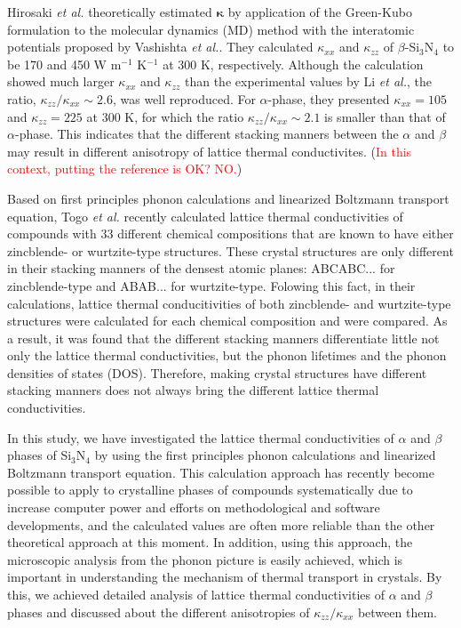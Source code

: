 \documentclass[twocolumn,amsmath,amssymb,a4paper,prb,superscriptaddress,floatfix]{revtex4-1}
\begin{document}
Hirosaki {\it et al.}\cite{hirosaki-md} theoretically estimated
$\boldsymbol{\kappa}$ by application of the Green-Kubo formulation to
the molecular dynamics (MD) method with the interatomic potentials
proposed by Vashishta {\it et al.}\cite{vashishta}. They calculated
$\kappa_{xx}$ and $\kappa_{zz}$ of $\beta$-Si$_3$N$_4$ to be 170 and 450
W m$^{-1}$ K$^{-1}$ at 300 K, respectively. Although the calculation
showed much larger $\kappa_{xx}$ and $\kappa_{zz}$ than the experimental
values by Li {\it et al.}, the ratio, $\kappa_{zz}/\kappa_{xx} \sim
2.6$, was well reproduced. For $\alpha$-phase, they presented
$\kappa_{xx}=105$ and $\kappa_{zz}=225$ at 300 K, for which the ratio
$\kappa_{zz}/\kappa_{xx} \sim 2.1$ is smaller than that of
$\alpha$-phase. This indicates that the different stacking manners
between the $\alpha$ and $\beta$ may result in different anisotropy of
lattice thermal conductivites.%
(\textcolor{red}{In
this context, putting the reference is OK? NO.})

Based on first principles phonon calculations and linearized Boltzmann
transport equation\cite{phono3py}, Togo {\it{et al.}} recently
calculated lattice thermal conductivities of compounds with 33 different
chemical compositions that are known to have either zincblende- or
wurtzite-type structures. These crystal structures are only different in
their stacking manners of the densest atomic planes: ABCABC... for
zincblende-type and ABAB... for wurtzite-type. Folowing this fact, in
their calculations, lattice thermal conducitivities of both zincblende-
and wurtzite-type structures were calculated for each chemical
composition and were compared. As a result, it was found that the
different stacking manners differentiate little not only the lattice
thermal conductivities, but the phonon lifetimes and the phonon
densities of states (DOS).\cite{phono3py} Therefore, making crystal
structures have different stacking manners does not always bring the
different lattice thermal conductivities.

In this study, we have investigated the lattice thermal conductivities
of $\alpha$ and $\beta$ phases of Si$_3$N$_4$ by using the first
principles phonon calculations and linearized Boltzmann transport
equation. This calculation approach has recently become possible to
apply to crystalline phases of compounds systematically due to increase
computer power and efforts on methodological and software developments,
and the calculated values are often more reliable than the other
theoretical approach at this moment. In addition, using this approach,
the microscopic analysis from the phonon picture is easily achieved,
which is important in understanding the mechanism of thermal transport
in crystals. By this, we achieved detailed analysis of lattice thermal
conductivities of $\alpha$ and $\beta$ phases and discussed about the
different anisotropies of $\kappa_{zz}/\kappa_{xx}$ between them.
\end{document}
